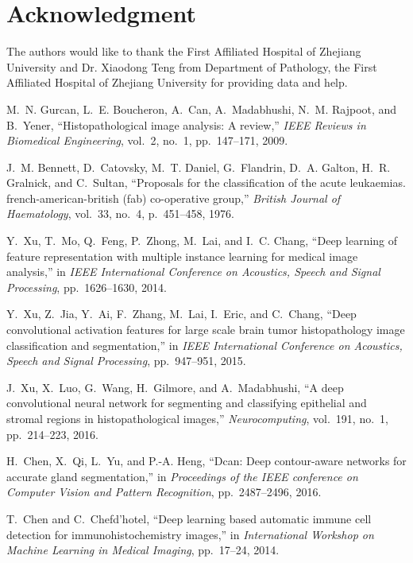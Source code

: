\documentclass[journal]{IEEEtran}
\begin{document}
\section{Acknowledgment}
The authors would like to thank the First Affiliated Hospital of Zhejiang University and Dr. Xiaodong Teng from Department of Pathology, the First Affiliated Hospital of Zhejiang University for providing data and help.
\medskip

\begin{thebibliography}{10}

M.~N. Gurcan, L.~E. Boucheron, A.~Can, A.~Madabhushi, N.~M. Rajpoot, and
  B.~Yener, ``Histopathological image analysis: A review,'' {\em IEEE Reviews
  in Biomedical Engineering}, vol.~2, no.~1, pp.~147--171, 2009.

J.~M. Bennett, D.~Catovsky, M.~T. Daniel, G.~Flandrin, D.~A. Galton, H.~R.
  Gralnick, and C.~Sultan, ``Proposals for the classification of the acute
  leukaemias. french-american-british (fab) co-operative group,'' {\em British
  Journal of Haematology}, vol.~33, no.~4, p.~451–458, 1976.

Y.~Xu, T.~Mo, Q.~Feng, P.~Zhong, M.~Lai, and I.~C. Chang, ``Deep learning of
  feature representation with multiple instance learning for medical image
  analysis,'' in {\em IEEE International Conference on Acoustics, Speech and
  Signal Processing}, pp.~1626--1630, 2014.

Y.~Xu, Z.~Jia, Y.~Ai, F.~Zhang, M.~Lai, I.~Eric, and C.~Chang, ``Deep
  convolutional activation features for large scale brain tumor histopathology
  image classification and segmentation,'' in {\em IEEE International
  Conference on Acoustics, Speech and Signal Processing}, pp.~947--951, 2015.

J.~Xu, X.~Luo, G.~Wang, H.~Gilmore, and A.~Madabhushi, ``A deep convolutional
  neural network for segmenting and classifying epithelial and stromal regions
  in histopathological images,'' {\em Neurocomputing}, vol.~191, no.~1,
  pp.~214--223, 2016.

H.~Chen, X.~Qi, L.~Yu, and P.-A. Heng, ``Dcan: Deep contour-aware networks for
  accurate gland segmentation,'' in {\em Proceedings of the IEEE conference on
  Computer Vision and Pattern Recognition}, pp.~2487--2496, 2016.

T.~Chen and C.~Chefd’hotel, ``Deep learning based automatic immune cell
  detection for immunohistochemistry images,'' in {\em International Workshop
  on Machine Learning in Medical Imaging}, pp.~17--24, 2014.


\end{thebibliography}
\end{document}
